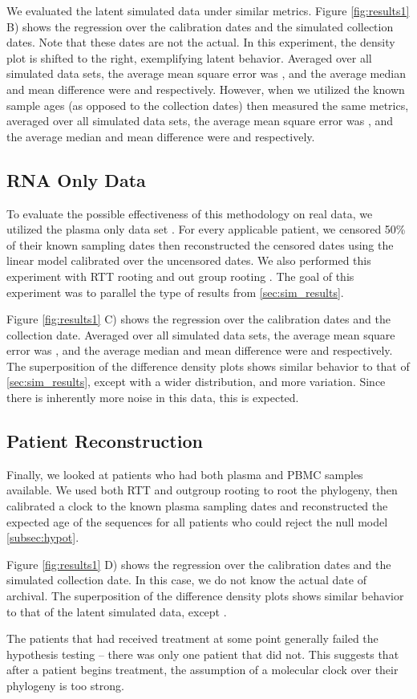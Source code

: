 We evaluated the latent simulated data under similar metrics. Figure \ref{fig:results1} B) shows the regression over the calibration dates and the simulated collection dates. Note that these dates are not the actual. In this experiment, the density plot is shifted to the right, exemplifying latent behavior. Averaged over all simulated data sets, the average mean square error was , and the average median and mean difference were  and  respectively. However, when we utilized the known sample ages (as opposed to the collection dates) then measured the same metrics, averaged over all simulated data sets, the average mean square error was , and the average median and mean difference were  and  respectively.

\subsection{RNA Only Data} \label{sec:rna_only}
To evaluate the possible effectiveness of this methodology on real data, we utilized the plasma only data set \citep{McCloskey14}. For every applicable patient, we censored 50\% of their known sampling dates then reconstructed the censored dates using the linear model calibrated over the uncensored dates. We also performed this experiment with RTT rooting and out group rooting . The goal of this experiment was to parallel the type of results from \ref{sec:sim_results}.

Figure \ref{fig:results1} C) shows the regression over the calibration dates and the collection date. Averaged over all simulated data sets, the average mean square error was , and the average median and mean difference were  and  respectively. The superposition of the difference density plots shows similar behavior to that of \ref{sec:sim_results}, except with a wider distribution, and more variation. Since there is inherently more noise in this data, this is expected. 

\subsection{Patient Reconstruction}
Finally, we looked at patients who had both plasma and PBMC samples available. We used both RTT and outgroup rooting to root the phylogeny, then calibrated a clock to the known plasma sampling dates and reconstructed the expected age of the sequences for all patients who could reject the null model \ref{subsec:hypot}. 

Figure \ref{fig:results1} D) shows the regression over the calibration dates and the simulated collection date. In this case, we do not know the actual date of archival.  The superposition of the difference density plots shows similar behavior to that of the latent simulated data, except .  

The patients that had received treatment at some point generally failed the hypothesis testing -- there was only one patient that did not. This suggests that after a patient begins treatment, the assumption of a molecular clock over their phylogeny is too strong. 
